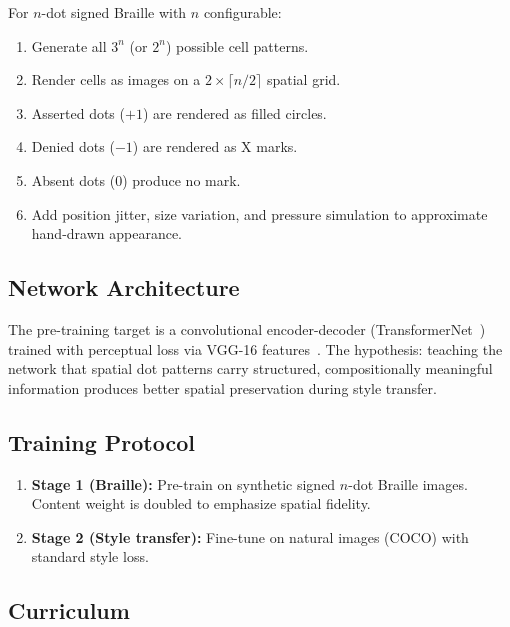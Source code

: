 \documentclass[11pt,a4paper]{article}
\begin{document}
For $n$-dot signed Braille with $n$ configurable:
\begin{enumerate}
  \item Generate all $3^n$ (or $2^n$) possible cell patterns.
  \item Render cells as images on a $2 \times \lceil n/2 \rceil$ spatial grid.
  \item Asserted dots ($+1$) are rendered as filled circles.
  \item Denied dots ($-1$) are rendered as X marks.
  \item Absent dots ($0$) produce no mark.
  \item Add position jitter, size variation, and pressure simulation
    to approximate hand-drawn appearance.
\end{enumerate}

\subsection{Network Architecture}

The pre-training target is a convolutional encoder-decoder
(TransformerNet~\cite{johnson2016perceptual}) trained with perceptual
loss via VGG-16 features~\cite{simonyan2015vgg}.
The hypothesis: teaching the network that spatial dot patterns carry
structured, compositionally meaningful information produces better
spatial preservation during style transfer.

\subsection{Training Protocol}

\begin{enumerate}
  \item \textbf{Stage 1 (Braille):}
    Pre-train on synthetic signed $n$-dot Braille images.
    Content weight is doubled to emphasize spatial fidelity.
  \item \textbf{Stage 2 (Style transfer):}
    Fine-tune on natural images (COCO) with standard style loss.
\end{enumerate}

\subsection{Curriculum}
\end{document}
